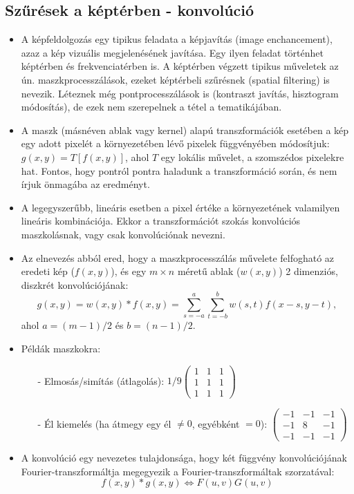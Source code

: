 \documentclass[12pt]{article}
\theoremstyle{plain}
\begin{document}
\subsection{Szűrések a képtérben - konvolúció}
\begin{itemize}
\item A képfeldolgozás egy tipikus feladata a képjavítás (image enchancement), azaz a kép vizuális megjelenésének javítása. Egy ilyen feladat történhet képtérben és frekvenciatérben is. A képtérben végzett tipikus műveletek az ún. maszkprocesszálások, ezeket képtérbeli szűrésnek (spatial filtering) is nevezik. Léteznek még pontprocesszálások is (kontraszt javítás, hisztogram módosítás), de ezek nem szerepelnek a tétel a tematikájában.
\item A maszk (másnéven ablak vagy kernel) alapú transzformációk esetében a kép egy adott pixelét a környezetében lévő pixelek függvényében módosítjuk: $g(x,y) = T[f(x,y)]$, ahol $T$ egy lokális művelet, a szomszédos pixelekre hat. Fontos, hogy pontról pontra haladunk a transzformáció során, és nem írjuk önmagába az eredményt.
\item A legegyszerűbb, lineáris esetben a pixel értéke a környezetének valamilyen lineáris kombinációja. Ekkor a transzformációt szokás konvolúciós maszkolásnak, vagy csak konvolúciónak nevezni.
\item Az elnevezés abból ered, hogy a maszkprocesszálás művelete felfogható az eredeti kép ($f(x,y)$), és egy $m \times n$ méretű ablak ($w(x,y)$) 2 dimenziós, diszkrét konvolúciójának:
$$g(x,y) = w(x,y) * f(x,y) = \sum^a_{s = -a}\sum^b _{t=-b}w(s,t)f(x-s,y-t),$$
ahol $a = (m-1)/2$ és $b = (n-1)/2.$
\item Példák maszkokra:
\begin{itemize}
\item[-] Elmosás/simítás (átlagolás): $1/9 \begin{pmatrix} 
1 & 1 & 1 \\
1&1 & 1 \\
1 & 1 & 1
\end{pmatrix}$
\item[-] Él kiemelés (ha átmegy egy él $\neq 0$, egyébként $=0$): $\begin{pmatrix} 
-1 & -1 & -1 \\
-1&8 & -1 \\
-1 & -1 & -1
\end{pmatrix}$
\end{itemize}{}
\item A konvolúció egy nevezetes tulajdonsága, hogy két függvény konvolúciójának Fourier-transzformáltja megegyezik a Fourier-transzformáltak szorzatával:
$$f(x,y) * g(x,y) \Longleftrightarrow F(u,v)G(u,v)$$
\end{itemize}{}
\end{document}
